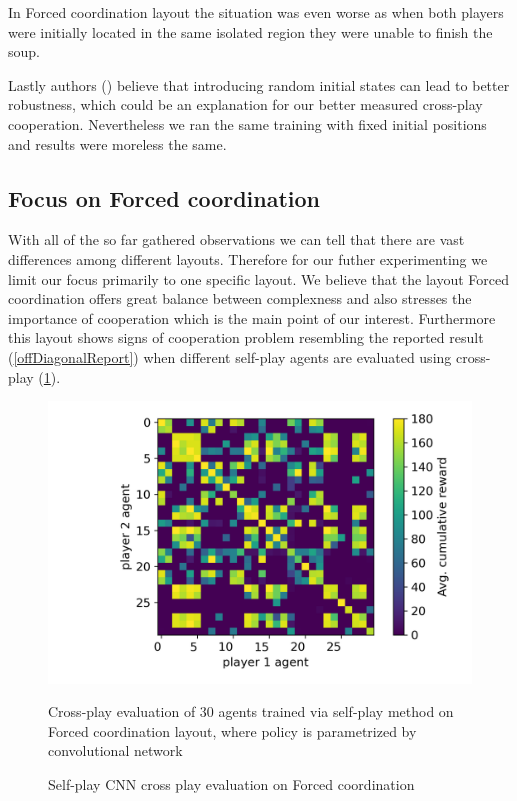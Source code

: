 In Forced coordination layout the situation was even worse as when both players were initially located in the same isolated region they were unable to finish the soup.

Lastly authors (\cite{knott2021evaluating}) believe that introducing random initial states can lead to better robustness, which could be an explanation for our better measured cross-play cooperation.
Nevertheless we ran the same training with fixed initial positions and results were moreless the same.

\subsection{Focus on Forced coordination}
With all of the so far gathered observations we can tell that there are vast differences among different layouts. 
Therefore for our futher experimenting we limit our focus primarily to one specific layout.
We believe that the layout Forced coordination offers great balance between complexness and also stresses the importance of cooperation which is the main point of our interest.
Furthermore this layout shows signs of cooperation problem resembling the reported result (\ref{offDiagonalReport}) when different self-play agents are evaluated using cross-play (\ref{ForcedCoordinationCNNSPCrossPlay}).

\begin{figure}[!ht]
  \centering
  \includegraphics*[width=14cm]{../img/Forced_coordination_CNN_SP_CrossPlay.png}
  \caption{Self-play CNN cross play evaluation on Forced coordination}
  \label{ForcedCoordinationCNNSPCrossPlay}
  \medskip
  \small 
  Cross-play evaluation of 30 agents trained via self-play method on Forced coordination layout, where policy is parametrized by convolutional network

\end{figure}